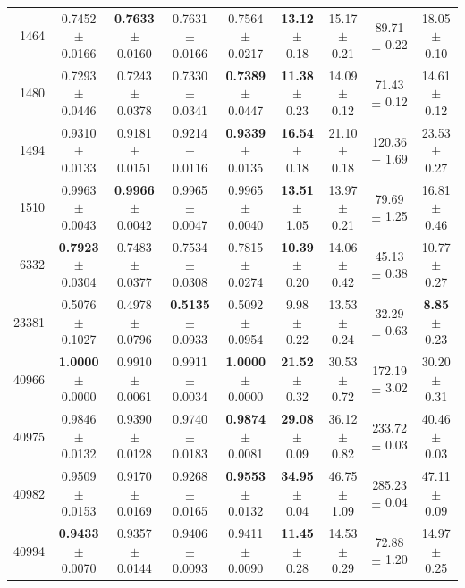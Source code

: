 \begin{table}[t]
\begin{tabular}{@{}rcccc@{\hspace{5pt}}cccc@{}}
1464 & 0.7452 $\pm$ 0.0166 & \textbf{0.7633} $\pm$ 0.0160 & 0.7631 $\pm$ 0.0166 & 0.7564 $\pm$ 0.0217 & \textbf{13.12} $\pm$ 0.18 & 15.17 $\pm$ 0.21 & 89.71 $\pm$ 0.22 & 18.05 $\pm$ 0.10 \\
1480 & 0.7293 $\pm$ 0.0446 & 0.7243 $\pm$ 0.0378 & 0.7330 $\pm$ 0.0341 & \textbf{0.7389} $\pm$ 0.0447 & \textbf{11.38} $\pm$ 0.23 & 14.09 $\pm$ 0.12 & 71.43 $\pm$ 0.12 & 14.61 $\pm$ 0.12 \\
1494 & 0.9310 $\pm$ 0.0133 & 0.9181 $\pm$ 0.0151 & 0.9214 $\pm$ 0.0116 & \textbf{0.9339} $\pm$ 0.0135 & \textbf{16.54} $\pm$ 0.18 & 21.10 $\pm$ 0.18 & 120.36 $\pm$ 1.69 & 23.53 $\pm$ 0.27 \\
1510 & 0.9963 $\pm$ 0.0043 & \textbf{0.9966} $\pm$ 0.0042 & 0.9965 $\pm$ 0.0047 & 0.9965 $\pm$ 0.0040 & \textbf{13.51} $\pm$ 1.05 & 13.97 $\pm$ 0.21 & 79.69 $\pm$ 1.25 & 16.81 $\pm$ 0.46 \\
6332 & \textbf{0.7923} $\pm$ 0.0304 & 0.7483 $\pm$ 0.0377 & 0.7534 $\pm$ 0.0308 & 0.7815 $\pm$ 0.0274 & \textbf{10.39} $\pm$ 0.20 & 14.06 $\pm$ 0.42 & 45.13 $\pm$ 0.38 & 10.77 $\pm$ 0.27 \\
23381 & 0.5076 $\pm$ 0.1027 & 0.4978 $\pm$ 0.0796 & \textbf{0.5135} $\pm$ 0.0933 & 0.5092 $\pm$ 0.0954 & 9.98 $\pm$ 0.22 & 13.53 $\pm$ 0.24 & 32.29 $\pm$ 0.63 & \textbf{8.85} $\pm$ 0.23 \\
40966 & \textbf{1.0000} $\pm$ 0.0000 & 0.9910 $\pm$ 0.0061 & 0.9911 $\pm$ 0.0034 & \textbf{1.0000} $\pm$ 0.0000 & \textbf{21.52} $\pm$ 0.32 & 30.53 $\pm$ 0.72 & 172.19 $\pm$ 3.02 & 30.20 $\pm$ 0.31 \\
40975 & 0.9846 $\pm$ 0.0132 & 0.9390 $\pm$ 0.0128 & 0.9740 $\pm$ 0.0183 & \textbf{0.9874} $\pm$ 0.0081 & \textbf{29.08} $\pm$ 0.09 & 36.12 $\pm$ 0.82 & 233.72 $\pm$ 0.03 & 40.46 $\pm$ 0.03 \\
40982 & 0.9509 $\pm$ 0.0153 & 0.9170 $\pm$ 0.0169 & 0.9268 $\pm$ 0.0165 & \textbf{0.9553} $\pm$ 0.0132 & \textbf{34.95} $\pm$ 0.04 & 46.75 $\pm$ 1.09 & 285.23 $\pm$ 0.04 & 47.11 $\pm$ 0.09 \\
40994 & \textbf{0.9433} $\pm$ 0.0070 & 0.9357 $\pm$ 0.0144 & 0.9406 $\pm$ 0.0093 & 0.9411 $\pm$ 0.0090 & \textbf{11.45} $\pm$ 0.28 & 14.53 $\pm$ 0.29 & 72.88 $\pm$ 1.20 & 14.97 $\pm$ 0.25 \\
\bottomrule
\end{tabular}
\end{table}
